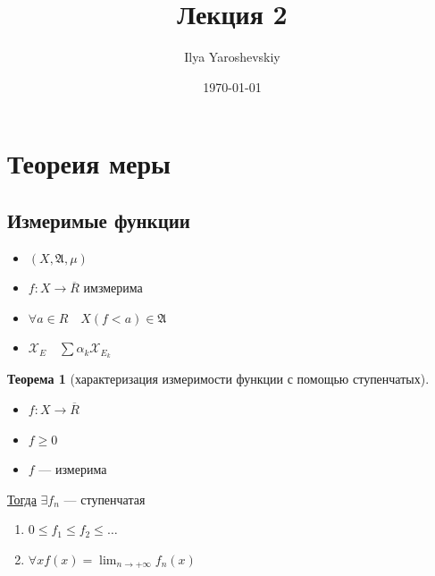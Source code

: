 \documentclass[english]{article}
\author{Ilya Yaroshevskiy}
\date{\today}
\title{Лекция 2}
\theoremstyle{plain}
\theoremstyle{remark}
\theoremstyle{definition}
\newtheorem{theorem}{Теорема}[section]
\begin{document}
\maketitle
\tableofcontents

\newcommand{\X}{\mathcal{X}}
\newcommand{\A}{\mathfrak{A}}

\section{Теореия меры}
\label{sec:org4f17b8c}
\subsection{Измеримые функции}
\label{sec:org9461656}
\begin{itemize}
\item \((X, \A, \mu)\)
\item \(f: X \to \overline{R}\) имзмерима
\item \(\forall a \in R\quad X(f < a) \in \A\)
\item \(\X_E\quad \sum \alpha_k \X_{E_k}\)
\end{itemize}
\begin{theorem}[характеризация измеримости функции с помощью ступенчатых]
\-
\begin{itemize}
\item \(f: X \to \overline{R}\)
\item \(f \ge 0\)
\item \(f\) --- измерима
\end{itemize}
\uline{Тогда} \(\exists f_n\) --- ступенчатая
\begin{enumerate}
\item \(0 \le f_1 \le f_2 \le \dots\)
\item \(\forall x f(x) = \lim_{n \to + \infty}f_n(x)\)
\end{enumerate}
\label{org4c71403}
\end{theorem}
\end{document}

